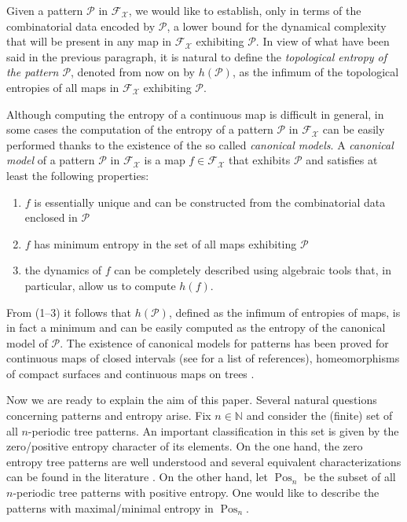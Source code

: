 \documentclass[a4paper]{amsart}
\theoremstyle{definition}
\DeclareMathOperator{\Pos}{Pos}
\begin{document}
Given a pattern $\mathcal{P}$ in $\mathcal{F}_\mathcal{X}$, we would like to establish, only in terms of the combinatorial
data encoded by $\mathcal{P}$, a lower bound for the dynamical complexity that will be present in any map in $\mathcal{F}_\mathcal{X}$
exhibiting $\mathcal{P}$. In view of what have been said in the previous paragraph, it is natural to define
the \emph{topological entropy of the pattern $\mathcal{P}$}, denoted from now on by $h(\mathcal{P})$, as the infimum of the
topological entropies of all maps in $\mathcal{F}_\mathcal{X}$ exhibiting $\mathcal{P}$.

Although computing the entropy of a continuous map is difficult in general, in some cases the computation of the
entropy of a pattern $\mathcal{P}$ in $\mathcal{F}_\mathcal{X}$ can be easily performed thanks to the existence of
the so called \emph{canonical models}. A \emph{canonical model} of a pattern
$\mathcal{P}$ in $\mathcal{F}_\mathcal{X}$ is a map $f\in\mathcal{F}_\mathcal{X}$ that exhibits $\mathcal{P}$
and satisfies at least the following properties:
\begin{enumerate}
\item[(1)] $f$ is essentially unique and can be constructed from the combinatorial data enclosed in $\mathcal{P}$
\item[(2)] $f$ has minimum entropy in the set of all maps exhibiting $\mathcal{P}$
\item[(3)] the dynamics of $f$ can be completely described using algebraic tools that, in particular, allow us to compute $h(f)$.
\end{enumerate}
From (1--3) it follows that $h(\mathcal{P})$, defined as the infimum of entropies of maps, is in fact a minimum and can be
easily computed as the entropy of the canonical model of $\mathcal{P}$. The existence of canonical
models for patterns has been proved for continuous maps of closed intervals (see \cite{biblia} for a list of
references), homeomorphisms of compact surfaces \cite{fat,Thu} and continuous maps on trees \cite{aglmm}.

Now we are ready to explain the aim of this paper. Several natural questions concerning patterns and entropy arise.
Fix $n\in\mathbb{N}$ and consider the (finite) set of all $n$-periodic tree patterns. An important classification in this set is
given by the zero/positive entropy character of its elements. On the one hand, the zero entropy tree patterns are well understood
and several equivalent characterizations can be found in the literature \cite{Blokh,aglmm,reducibility}. On the other hand,
let $\Pos_n$ be the subset of all $n$-periodic tree patterns with positive entropy. One would like to describe the patterns with
maximal/minimal entropy in $\Pos_n$.
\end{document}
